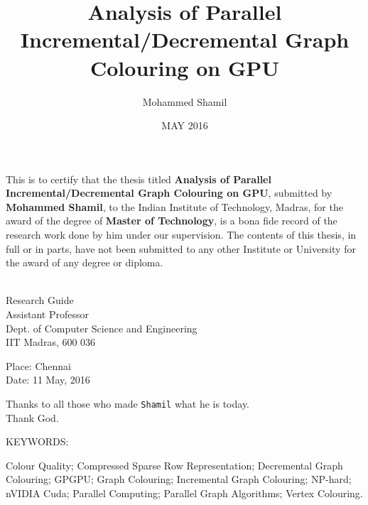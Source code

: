 \documentclass[MTech]{iitmdiss}
\def\thesistitle{Analysis of Parallel Incremental/Decremental Graph Colouring on GPU}
\def\thesisauthor{Mohammed Shamil}
\begin{document}

\title{\thesistitle}

\author{\thesisauthor}

\date{MAY 2016}

\maketitle

\certificate

\vspace*{0.5in}

\noindent This is to certify that the thesis titled {\bf {\thesistitle}}, submitted by {\bf {\thesisauthor}}, 
  to the Indian Institute of Technology, Madras, for
the award of the degree of {\bf Master of Technology}, is a bona fide
record of the research work done by him under our supervision.  The
contents of this thesis, in full or in parts, have not been submitted
to any other Institute or University for the award of any degree or
diploma.

\vspace*{1.5in}
\hspace*{-0.25in}
\begin{singlespace}
 \\
\noindent Research Guide \\ 
\noindent Assistant Professor \\
\noindent Dept. of Computer Science and Engineering\\
\noindent IIT Madras, 600 036 \\
\end{singlespace}
\vspace*{0.25in}
\noindent Place: Chennai\\ 
Date: 11 May, 2016


\acknowledgements

Thanks to all those who made \verb+Shamil+ what he is today.
\\
Thank God.

\abstract

\noindent KEYWORDS: \hspace*{0.5em} \parbox[t]{4.4in}{Colour Quality; Compressed Sparse Row Representation; Decremental Graph Colouring; GPGPU; Graph Colouring; Incremental Graph Colouring; NP-hard; nVIDIA Cuda; Parallel Computing; Parallel Graph Algorithms; Vertex Colouring.}
\end{document}
